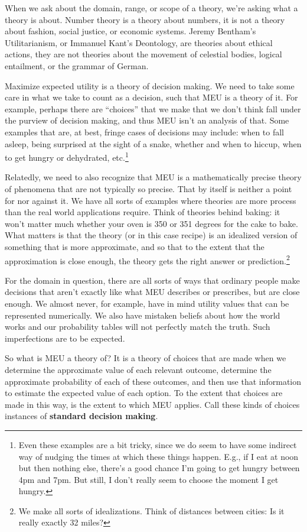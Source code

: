 \documentclass[]{tufte-book}
\begin{document}
When we ask about the domain, range, or scope of a theory, we're asking what a theory is about. Number theory is a theory about numbers, it is not a theory about fashion, social justice, or economic systems. Jeremy Bentham's Utilitarianism, or Immanuel Kant's Deontology, are theories about ethical actions, they are not theories about the movement of celestial bodies, logical entailment, or the grammar of German.

Maximize expected utility is a theory of decision making. We need to take some care in what we take to count as a decision, such that MEU is a theory of it. For example, perhaps there are ``choices'' that we make that we don't think fall under the purview of decision making, and thus MEU isn't an analysis of that. Some examples that are, at best, fringe cases of decisions may include: when to fall asleep, being surprised at the sight of a snake, whether and when to hiccup, when to get hungry or dehydrated, etc.\footnote{Even these examples are a bit tricky, since we do seem to have some indirect way of nudging the times at which these things happen. E.g., if I eat at noon but then nothing else, there's a good chance I'm going to get hungry between 4pm and 7pm. But still, I don't really seem to choose the moment I get hungry.}

Relatedly, we need to also recognize that MEU is a mathematically precise theory of phenomena that are not typically so precise. That by itself is neither a point for nor against it. We have all sorts of examples where theories are more process than the real world applications require. Think of theories behind baking: it won't matter much whether your oven is 350 or 351 degrees for the cake to bake. What matters is that the theory (or in this case recipe) is an idealized version of something that is more approximate, and so that to the extent that the approximation is close enough, the theory gets the right answer or prediction.\footnote{We make all sorts of idealizations. Think of distances between cities: Is it really exactly 32 miles?}

For the domain in question, there are all sorts of ways that ordinary people make decisions that aren't exactly like what MEU describes or prescribes, but are close enough. We almost never, for example, have in mind utility values that can be represented numerically. We also have mistaken beliefs about how the world works and our probability tables will not perfectly match the truth. Such imperfections are to be expected.

So what is MEU a theory of? It is a theory of choices that are made when we determine the approximate value of each relevant outcome, determine the approximate probability of each of these outcomes, and then use that information to estimate the expected value of each option. To the extent that choices are made in this way, is the extent to which MEU applies. Call these kinds of choices instances of \textbf{standard decision making}.
\end{document}
